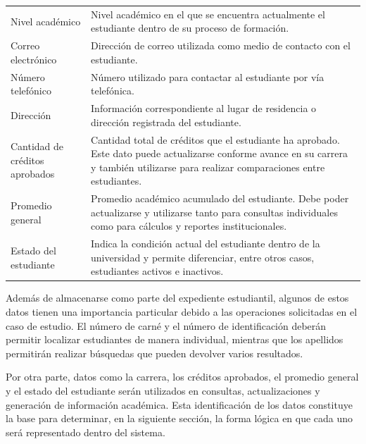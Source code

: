 \begin{longtable}{p{4cm} p{10cm}}
Nivel académico &
Nivel académico en el que se encuentra actualmente el estudiante dentro
de su proceso de formación. \\

Correo electrónico &
Dirección de correo utilizada como medio de contacto con el estudiante. \\

Número telefónico &
Número utilizado para contactar al estudiante por vía telefónica. \\

Dirección &
Información correspondiente al lugar de residencia o dirección registrada
del estudiante. \\

Cantidad de créditos aprobados &
Cantidad total de créditos que el estudiante ha aprobado. Este dato puede
actualizarse conforme avance en su carrera y también utilizarse para
realizar comparaciones entre estudiantes. \\

Promedio general &
Promedio académico acumulado del estudiante. Debe poder actualizarse y
utilizarse tanto para consultas individuales como para cálculos y
reportes institucionales. \\

Estado del estudiante &
Indica la condición actual del estudiante dentro de la universidad y
permite diferenciar, entre otros casos, estudiantes activos e inactivos. \\

\bottomrule
\end{longtable}

Además de almacenarse como parte del expediente estudiantil, algunos de
estos datos tienen una importancia particular debido a las operaciones
solicitadas en el caso de estudio. El número de carné y el número de
identificación deberán permitir localizar estudiantes de manera
individual, mientras que los apellidos permitirán realizar búsquedas que
pueden devolver varios resultados.

Por otra parte, datos como la carrera, los créditos aprobados, el promedio
general y el estado del estudiante serán utilizados en consultas,
actualizaciones y generación de información académica. Esta identificación
de los datos constituye la base para determinar, en la siguiente sección,
la forma lógica en que cada uno será representado dentro del sistema.